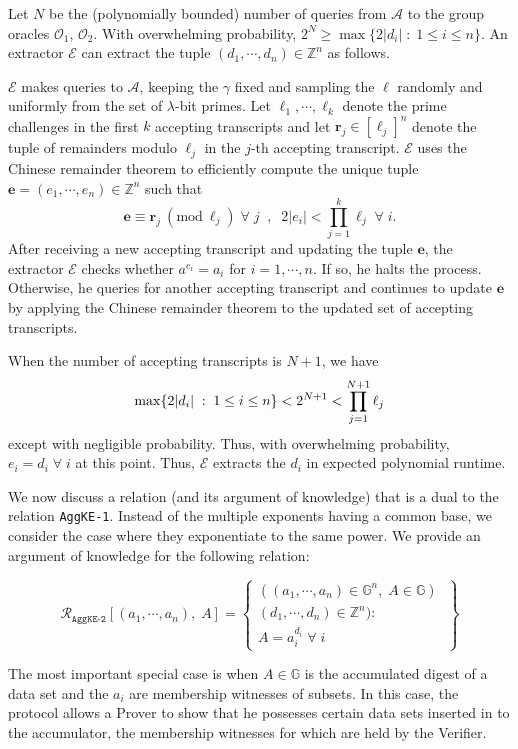 \documentclass[11pt, lettersize, notitlepage, leqno, footskip=0.6cm]{article}
\newcommand{\bz}{\mathbb Z}
\newcommand{\pl}{\prod\limits}
\newcommand{\ttt}{\texttt}
\newcommand{\bG}{\mathbb{G}}
\newcommand{\mc}{\mathcal}
\newcommand{\mb}{\mathbb}
\newcommand{\mbf}{\mathbf}
\newcommand{\lam}{\lambda}
\newcommand{\A}{\mc{A}}
\newcommand{\vs}{\vspace{-0.15cm}}
\newcommand{\noin}{\noindent}
\newcommand{\op}{overwhelming probability}
\newcommand{\np}{negligible probability}
\newcommand{\Mod}[1]{\ (\mathrm{mod}\ #1)}
\newcommand{\E}{\mc{E}}
\numberwithin{equation}{section}
\begin{document}
\begin{prf}
Let $N$ be the (polynomially bounded) number of queries from $\A$ to the group oracles $\mc{O}_1$, $\mc{O}_2$. With \op, $2^{N} \geq \max\{2|d_i|\;:\;1\leq i\leq n \}$. An extractor $\E$ can extract the tuple $(d_1,\cdots,d_n)\in\bz^n$ as follows. 

$\E$ makes queries to $\A$, keeping the $\gamma$ fixed and sampling the $\ell$ randomly and uniformly from the set of $\lam$-bit primes. Let $\ell_1,\cdots,\ell_{k}$ denote the prime challenges in the first $k$ accepting transcripts and let $\mbf{r}_j\in [\ell_j]^n$ denote the tuple of remainders modulo $\ell_j$ in the $j$-th accepting transcript. $\E$ uses the Chinese remainder theorem to efficiently compute the unique tuple $\mbf{e} = (e_1,\cdots,e_n)\in \bz^n$ such that \vs $$\mbf{e}\equiv \mbf{r}_j\Mod{\ell_j}\;\forall\; j\;\;,\;\;2|e_i|< \pl_{j=1}^{k} \ell_j\;\forall\; i.$$ After receiving a new accepting transcript and updating the tuple $\mbf{e}$, the extractor $\E$ checks whether $a^{e_i} = a_i$ for $i=1,\cdots,n$. If so, he halts the process. Otherwise, he queries for another accepting transcript and continues to update $\mbf{e}$ by applying the Chinese remainder theorem to the updated set of accepting transcripts.

When the number of accepting transcripts is $N+1$, we have \vs $$\max\{2|d_i|\;:\;1\leq i\leq n \} < 2^{N+1} < \pl_{j=1}^{N+1}\ell_j \vs $$ except with \np. Thus, with \op, $e_i = d_i\;\forall\;i$ at this point. Thus, $\E$ extracts the $d_i$ in expected polynomial runtime.\end{prf} 

\vspace{0.2cm}

\noin We now discuss a relation (and its argument of knowledge) that is a dual to the relation \verb|AggKE-1|. Instead of the multiple exponents having a common base, we consider the case where they exponentiate to the same power. We provide an argument of knowledge for the following relation: 

\[
  \mc{R}_{{\ttt{AggKE-2}}}[(a_1,\cdots, a_n),\;A] = \left\{\begin{array}{l}
    ((a_1,\cdots, a_n)\in \mb{G}^n,\; A\in\mb{G})\;\\ 
    (d_1,\cdots,d_n)\in\bz^n) :  \\
     A = a_i^{d_i}\;\forall\; i
  \end{array}\right\}
\]
\vspace{0.1cm}

The most important special case is when $A\in\bG$ is the accumulated digest of a data set and the $a_i$ are membership witnesses of subsets. In this case, the protocol allows a Prover to show that he possesses certain data sets inserted in to the accumulator, the membership witnesses for which are held by the Verifier.
\end{document}
